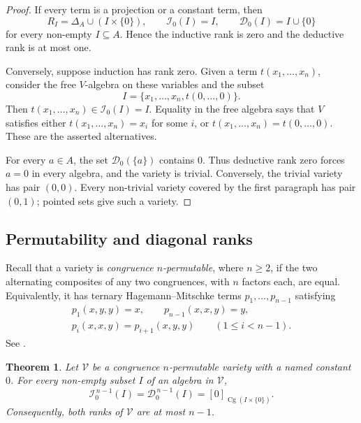 \documentclass[12pt,english]{amsart}
\newtheorem{theorem}{Theorem}[section]
\theoremstyle{definition}
\numberwithin{equation}{section}
\theoremstyle{remark}
\begin{document}
\begin{proof}
If every term is a projection or a constant term, then
\[
R_I=\Delta_A\cup(I\times\{0\}),\qquad
\mathcal I_0(I)=I,\qquad \mathcal D_0(I)=I\cup\{0\}
\]
for every non-empty $I\subseteq A$. Hence the inductive rank is zero and the deductive rank is at most one.

Conversely, suppose induction has rank zero. Given a term $t(x_1,\ldots,x_n)$, consider the free $V$-algebra on these variables and the subset
\[
I=\{x_1,\ldots,x_n,t(0,\ldots,0)\}.
\]
Then $t(x_1,\ldots,x_n)\in\mathcal I_0(I)=I$. Equality in the free algebra says that $V$ satisfies either $t(x_1,\ldots,x_n)=x_i$ for some $i$, or $t(x_1,\ldots,x_n)=t(0,\ldots,0)$. These are the asserted alternatives.

For every $a\in A$, the set $\mathcal D_0(\{a\})$ contains $0$. Thus deductive rank zero forces $a=0$ in every algebra, and the variety is trivial. Conversely, the trivial variety has pair $(0,0)$. Every non-trivial variety covered by the first paragraph has pair $(0,1)$; pointed sets give such a variety.
\end{proof}


\subsection{Permutability and diagonal ranks}\label{SubsecPermutableWitnesses}

Recall that a variety is \emph{congruence $n$-permutable}, where
$n\geqslant2$, if the two alternating composites of any two congruences,
with $n$ factors each, are equal. Equivalently, it has ternary
Hagemann--Mitschke terms $p_1,\ldots,p_{n-1}$ satisfying
\begin{equation}\label{EqHMIdentities}
\begin{gathered}
p_1(x,y,y)=x,\qquad p_{n-1}(x,x,y)=y,\\
p_i(x,x,y)=p_{i+1}(x,y,y)\qquad(1\leqslant i<n-1).
\end{gathered}
\end{equation}
See \cite{HM73}.

\begin{theorem}\label{ThmPermutableRank}
Let $\mathcal V$ be a congruence $n$-permutable variety with a named
constant $0$. For every non-empty subset $I$ of an algebra in
$\mathcal V$,
\[
\mathcal I_0^{\,n-1}(I)=\mathcal D_0^{\,n-1}(I)
=[0]_{\operatorname{Cg}(I\times\{0\})}.
\]
Consequently, both ranks of $\mathcal V$ are at most $n-1$.
\end{theorem}
\end{document}
